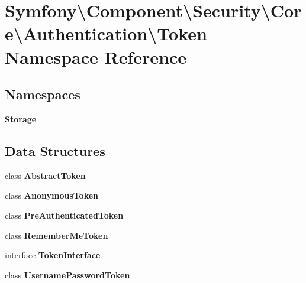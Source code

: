 \section{Symfony\textbackslash{}Component\textbackslash{}Security\textbackslash{}Core\textbackslash{}Authentication\textbackslash{}Token Namespace Reference}
\label{namespace_symfony_1_1_component_1_1_security_1_1_core_1_1_authentication_1_1_token}
\subsection*{Namespaces}
\begin{DoxyCompactItemize}
\item 
 {\bf Storage}
\end{DoxyCompactItemize}
\subsection*{Data Structures}
\begin{DoxyCompactItemize}
\item 
class {\bf Abstract\+Token}
\item 
class {\bf Anonymous\+Token}
\item 
class {\bf Pre\+Authenticated\+Token}
\item 
class {\bf Remember\+Me\+Token}
\item 
interface {\bf Token\+Interface}
\item 
class {\bf Username\+Password\+Token}
\end{DoxyCompactItemize}
